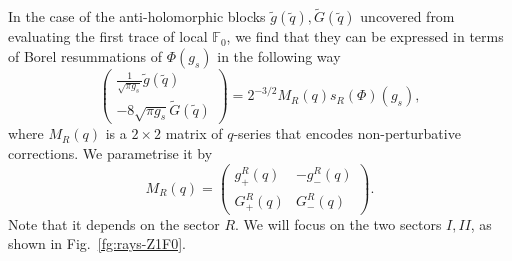 \documentclass[a4paper,11pt]{article}
\theoremstyle{definition}
\def\IF{{\mathbb F}}
\def\tq{{\tilde{q}}}
\begin{document}
In the case of the anti-holomorphic blocks
$\tilde{g}(\tq),\tilde{G}(\tq)$ uncovered from evaluating the first
trace of local $\IF_0$, we find that they can be expressed in terms of
Borel resummations of $\Phi(g_s)$ in the following way
\begin{equation}
  \begin{pmatrix}
    \frac{1}{\sqrt{\pi g_s}} \tilde{g}(\tq)\\
    -8\sqrt{\pi g_s} \tilde{G}(\tq)
  \end{pmatrix}
  = 2^{-3/2} M_R(q) s_R(\Phi)(g_s),
  \label{eq:rasymp-Z1F0}
\end{equation}
%
where $M_R(q)$ is a $2\times 2$ matrix of $q$-series that encodes
non-perturbative corrections.  We parametrise it by
\begin{equation}
  M_R(q) =
  \begin{pmatrix}
    g_+^R(q) & -g_-^R(q)\\
    G_+^R(q) & G_-^R(q)
  \end{pmatrix}.
\end{equation}
Note that it depends on the sector $R$.  We will focus on the two
sectors $I,II$, as shown in Fig.~\ref{fg:rays-Z1F0}.
\end{document}
